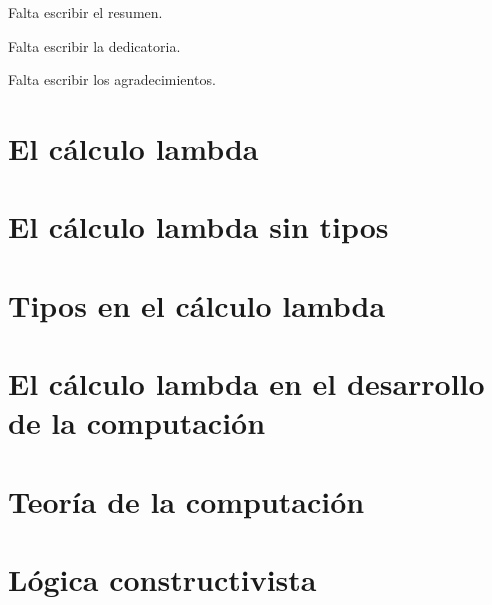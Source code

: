 \documentclass[12pt]{tesislcc}
\begin{document}

\portada%

\frontmatter

\begin{resumen}
  Falta escribir el resumen.
\end{resumen}

\begin{dedicatoria}
  Falta escribir la dedicatoria.
\end{dedicatoria}

\begin{agradecimientos}
  Falta escribir los agradecimientos.
\end{agradecimientos}

\tableofcontents

\mainmatter%

\introduccion%


\chapter{El cálculo lambda}


\chapter{El cálculo lambda sin tipos}


\chapter{Tipos en el cálculo lambda}


\chapter{El cálculo lambda en el desarrollo de la computación}


\chapter{Teoría de la computación}


\chapter{Lógica constructivista}

\end{document}
